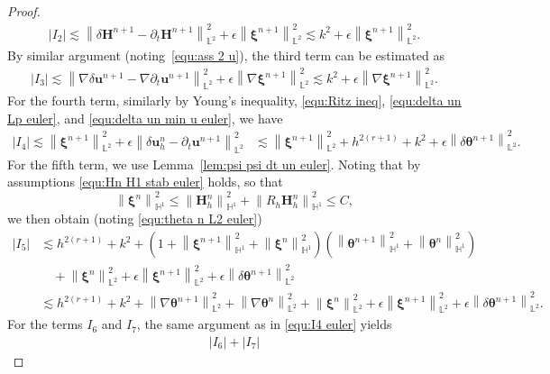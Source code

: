 \documentclass[11pt, reqno]{amsart}
\theoremstyle{definition}
\theoremstyle{remark}
\numberwithin{equation}{section}
\newcommand{\bff}{\boldsymbol}
\newcommand{\bb}{\mathbb}
\newcommand{\norm}[2]{\left\|{#1}\right\|_{#2}}
\newcommand{\abs}[1]{\left|{#1}\right|}
\begin{document}
\begin{proof}
\begin{align*}
		\abs{I_2}
		\lesssim
		\norm{\delta\bff{H}^{n+1}-\partial_t \bff{H}^{n+1}}{\bb{L}^2}^2
		+
		\epsilon \norm{\bff{\xi}^{n+1}}{\bb{L}^2}^2
		\lesssim
		k^2
		+
		\epsilon \norm{\bff{\xi}^{n+1}}{\bb{L}^2}^2.
	\end{align*}
	By similar argument (noting~\eqref{equ:ass 2 u}), the third term can be estimated as
	\begin{align*}
		\abs{I_3}
		\lesssim
		\norm{\nabla \delta\bff{u}^{n+1}-\nabla \partial_t \bff{u}^{n+1}}{\bb{L}^2}^2
		+
		\epsilon \norm{\nabla \bff{\xi}^{n+1}}{\bb{L}^2}^2
		\lesssim
		k^2
		+
		\epsilon \norm{\nabla \bff{\xi}^{n+1}}{\bb{L}^2}^2.
	\end{align*}
	For the fourth term, similarly by Young's inequality, \eqref{equ:Ritz ineq}, \eqref{equ:delta un Lp euler}, and \eqref{equ:delta un min u euler}, we have
	\begin{align}\label{equ:I4 euler}
		\abs{I_4}
		\lesssim
		\norm{\bff{\xi}^{n+1}}{\bb{L}^2}^2
		+
		\epsilon \norm{\delta \bff{u}_h^n-\partial_t \bff{u}^{n+1}}{\bb{L}^2}^2
		&\lesssim
		\norm{\bff{\xi}^{n+1}}{\bb{L}^2}^2
		+ h^{2(r+1)} + k^2
		+
		\epsilon \norm{\delta \bff{\theta}^{n+1}}{\bb{L}^2}^2.
	\end{align}
	For the fifth term, we use Lemma~\ref{lem:psi psi dt un euler}. Noting that by assumptions \eqref{equ:Hn H1 stab euler} holds, so that
	\[
		\norm{\bff{\xi}^n}{\bb{H}^1}^2 
		\leq
		\norm{\bff{H}_h^n}{\bb{H}^1}^2
		+
		\norm{R_h \bff{H}_h^n}{\bb{H}^1}^2 \leq C,
	\]
	we then obtain (noting \eqref{equ:theta n L2 euler})
	\begin{align*}
		\nonumber
		\abs{I_5}
		&\lesssim
		h^{2(r+1)} + k^2
		+
		\left(1+ \norm{\bff{\xi}^{n+1}}{\bb{H}^1}^2 + \norm{\bff{\xi}^n}{\bb{H}^1}^2\right) \left(\norm{\bff{\theta}^{n+1}}{\bb{H}^1}^2 + \norm{\bff{\theta}^n}{\bb{H}^1}^2 \right)
		\\
		\nonumber
		&\quad
		+
		\norm{\bff{\xi}^n}{\bb{L}^2}^2
		+
		\epsilon \norm{\bff{\xi}^{n+1}}{\bb{L}^2}^2
		+
		\epsilon \norm{\delta \bff{\theta}^{n+1}}{\bb{L}^2}^2
		\\
		&\lesssim
		h^{2(r+1)} + k^2
		+
		\norm{\nabla \bff{\theta}^{n+1}}{\bb{L}^2}^2 + \norm{\nabla \bff{\theta}^n}{\bb{L}^2}^2
		+
		\norm{\bff{\xi}^n}{\bb{L}^2}^2
		+
		\epsilon \norm{\bff{\xi}^{n+1}}{\bb{L}^2}^2
		+
		\epsilon \norm{\delta \bff{\theta}^{n+1}}{\bb{L}^2}^2.
	\end{align*}
	For the terms $I_6$ and $I_7$, the same argument as in \eqref{equ:I4 euler} yields
	\begin{align*}
		\abs{I_6}+\abs{I_7}

\end{align*}
\end{proof}
\end{document}
